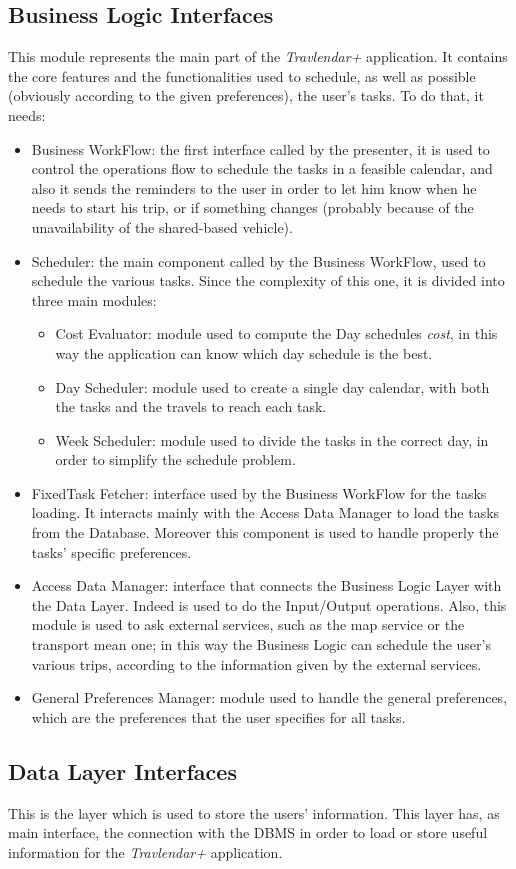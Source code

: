 \subsection*{Business Logic Interfaces}
This module represents the main part of the \emph{Travlendar+} application. It contains the core features and the functionalities used to schedule, as well as possible (obviously according to the given preferences), the user's tasks. To do that, it needs:
\begin{itemize}
    \item Business WorkFlow: the first interface called by the presenter, it is used to control the operations flow to schedule the tasks in a feasible calendar, and also it sends the reminders to the user in order to let him know when he needs to start his trip, or if something changes (probably because of the unavailability of the shared-based vehicle).
    \item Scheduler: the main component called by the Business WorkFlow, used to schedule the various tasks. Since the complexity of this one, it is divided into three main modules:
    
    \begin{itemize}
        \item Cost Evaluator: module used to compute the Day schedules \emph{cost}, in this way the application can know which day schedule is the best.
        \item Day Scheduler: module used to create a single day calendar, with both the tasks and the travels to reach each task.
        \item Week Scheduler: module used to divide the tasks in the correct day, in order to simplify the schedule problem.
    \end{itemize}
    
    \item FixedTask Fetcher: interface used by the Business WorkFlow for the tasks loading. It interacts mainly with the Access Data Manager to load the tasks from the Database. Moreover this component is used to handle properly the tasks' specific preferences.
    
    \item Access Data Manager: interface that connects the Business Logic Layer with the Data Layer. Indeed is used to do the Input/Output operations. Also, this module is used to ask external services, such as the map service or the transport mean one; in this way the Business Logic can schedule the user's various trips, according to the information given by the external services.
    
    \item General Preferences Manager: module used to handle the general preferences, which are the preferences that the user specifies for all tasks.
    
\end{itemize}

\subsection*{Data Layer Interfaces}
This is the layer which is used to store the users' information. This layer has, as main interface, the connection with the DBMS in order to load or store useful information for the \emph{Travlendar+} application.